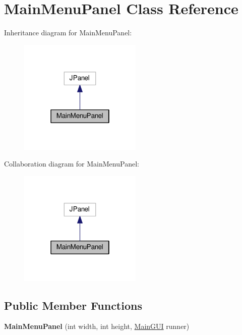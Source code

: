 \hypertarget{classMainMenuPanel}{}\section{Main\+Menu\+Panel Class Reference}
\label{classMainMenuPanel}


Inheritance diagram for Main\+Menu\+Panel\+:
\nopagebreak
\begin{figure}[H]
\begin{center}
\leavevmode
\includegraphics[width=166pt]{classMainMenuPanel__inherit__graph}
\end{center}
\end{figure}


Collaboration diagram for Main\+Menu\+Panel\+:
\nopagebreak
\begin{figure}[H]
\begin{center}
\leavevmode
\includegraphics[width=166pt]{classMainMenuPanel__coll__graph}
\end{center}
\end{figure}
\subsection*{Public Member Functions}
\begin{DoxyCompactItemize}
\item 
{\bfseries Main\+Menu\+Panel} (int width, int height, \hyperlink{classMainGUI}{Main\+G\+UI} runner)\hypertarget{classMainMenuPanel_a84d6e512c79963a1a77aaa48fa3c0211}{}\label{classMainMenuPanel_a84d6e512c79963a1a77aaa48fa3c0211}

\end{DoxyCompactItemize}
